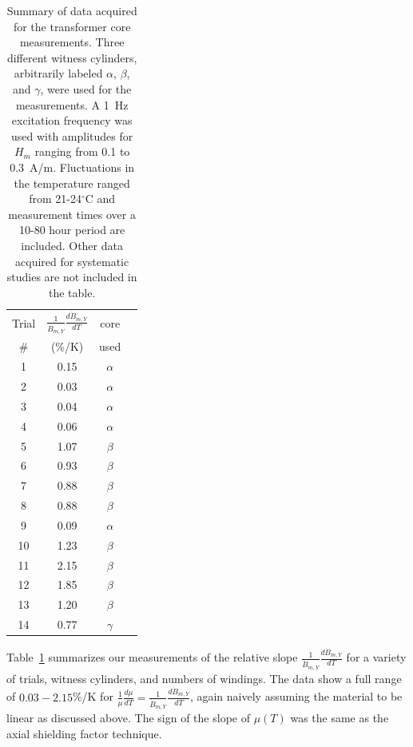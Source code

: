 \begin{table}
\begin{center}
\begin{tabular}{cccc}\hline
Trial & $\frac{1}{\dot{B}_{m,Y}}\frac{d\dot{B}_{m,Y}}{dT}$ & core \\
\#    & (\%/K) & used \\\hline
 1 & 0.15 & $\alpha$ \\
 2 & 0.03 & $\alpha$ \\
 3 & 0.04 & $\alpha$ \\
 4 & 0.06 & $\alpha$ \\
 5 & 1.07 & $\beta$  \\
 6 & 0.93 & $\beta$  \\
 7 & 0.88 & $\beta$  \\
 8 & 0.88 & $\beta$  \\
 9 & 0.09 & $\alpha$ \\
10 & 1.23 & $\beta$  \\
11 & 2.15 & $\beta$  \\
12 & 1.85 & $\beta$  \\
13 & 1.20 & $\beta$  \\
14 & 0.77 & $\gamma$ \\\hline
\end{tabular}
\caption{Summary of data acquired for the transformer core
  measurements.  Three different witness cylinders, arbitrarily
  labeled $\alpha$, $\beta$, and $\gamma$, were used for the
  measurements.  A 1~Hz excitation frequency was used with amplitudes
  for $H_m$ ranging from 0.1 to 0.3~A/m.  Fluctuations in the
  temperature ranged from 21-24$^\circ$C and measurement times over a
  10-80 hour period are included.  Other data acquired for systematic
  studies are not included in the table.\label{tab:transformer}}
\end{center}
\end{table}



Table~\ref{tab:transformer} summarizes our measurements of the
relative slope $\frac{1}{\dot{B}_{m,Y}}\frac{d\dot{B}_{m,Y}}{dT}$ for
a variety of trials, witness cylinders, and numbers of windings.  The
data show a full range of $0.03-2.15$\%/K for
$\frac{1}{\mu}\frac{d\mu}{dT}=\frac{1}{\dot{B}_{m,Y}}\frac{d\dot{B}_{m,Y}}{dT}$,
again naively assuming the material to be linear as discussed above.
The sign of the slope of $\mu(T)$ was the same as the axial shielding
factor technique.

